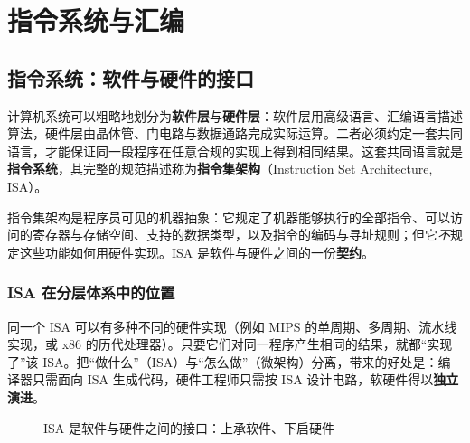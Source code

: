 \clearpage
\vspace*{\fill}
\section{指令系统与汇编}
\vspace*{\fill}
\clearpage


\subsection{指令系统：软件与硬件的接口}

计算机系统可以粗略地划分为\textbf{软件层}与\textbf{硬件层}：软件层用高级语言、汇编语言描述算法，硬件层由晶体管、门电路与数据通路完成实际运算。二者必须约定一套共同语言，才能保证同一段程序在任意合规的实现上得到相同结果。这套共同语言就是\textbf{指令系统}，其完整的规范描述称为\textbf{指令集架构}（Instruction Set Architecture, ISA）。

\begin{definition}[指令集架构]
指令集架构是程序员可见的机器抽象：它规定了机器能够执行的全部指令、可以访问的寄存器与存储空间、支持的数据类型，以及指令的编码与寻址规则；但它\emph{不}规定这些功能如何用硬件实现。ISA 是软件与硬件之间的一份\textbf{契约}。
\end{definition}

\subsubsection{ISA 在分层体系中的位置}

同一个 ISA 可以有多种不同的硬件实现（例如 MIPS 的单周期、多周期、流水线实现，或 x86 的历代处理器）。只要它们对同一程序产生相同的结果，就都“实现了”该 ISA。把“做什么”（ISA）与“怎么做”（微架构）分离，带来的好处是：编译器只需面向 ISA 生成代码，硬件工程师只需按 ISA 设计电路，软硬件得以\textbf{独立演进}。

\begin{figure}[H]
\centering
{}
\caption{ISA 是软件与硬件之间的接口：上承软件、下启硬件}
\label{fig:isa_layers}
\end{figure}

